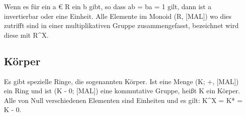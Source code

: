 			Wenn es für ein a € R ein b gibt, so dass ab = ba = 1 gilt, dann ist a invertierbar oder eine Einheit. Alle Elemente im Monoid (R, [MAL]) wo dies zutrifft sind in einer multiplikativen Gruppe zusammengefasst, bezeichnet wird diese mit R^X.~\cite{Erste:Hilfe:in:Linearer:Algebra}
			
		
		\subsection{Körper}
			Es gibt spezielle Ringe, die sogenannten Körper. Ist eine Menge (K; +, [MAL]) ein Ring und ist (K - {0}; [MAL]) eine kommutative Gruppe, heißt K ein Körper. Alle von Null verschiedenen Elementen sind Einheiten und es gilt: K^X = K* = K - {0}.~\cite{Erste:Hilfe:in:Linearer:Algebra}
			
			